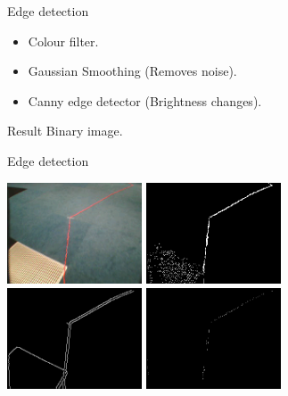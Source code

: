 \documentclass{beamer}
\begin{document}
\begin{frame}
\begin{block}{Edge detection}
\begin{itemize}
\item Colour filter.
\item Gaussian Smoothing (Removes noise).
\item Canny edge detector (Brightness changes).
\end{itemize}
\end{block}
\begin{block}{Result}
Binary image.
\end{block}
\end{frame}

\begin{frame}
\begin{block}{Edge detection}
\begin{center}
\includegraphics[width=0.3\textwidth]{images/canny_image.png}
\includegraphics[width=0.3\textwidth]{images/canny_image_filter.png}\\
\includegraphics[width=0.3\textwidth]{images/canny_detector.png}
\includegraphics[width=0.3\textwidth]{images/canny_combine.png}
\end{center}
\end{block}
\end{frame}
\end{document}
